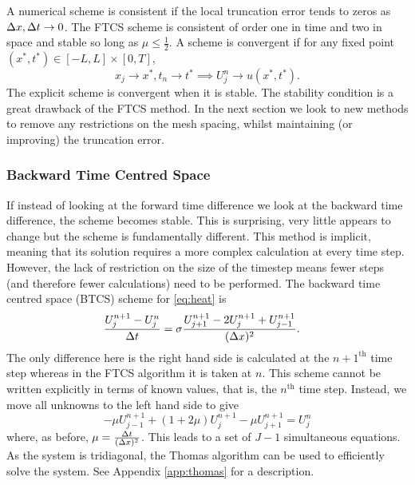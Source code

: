 A numerical scheme is consistent if the local truncation error tends to zeros as \(\Delta x, \Delta t \to 0\). The FTCS scheme is consistent of order one in time and two in space and stable so long as \(\mu \leq \frac{1}{2}\).  A scheme is convergent if for any fixed point  \((x^*,t^*) \in [-L,L] \times [0,T]\), \[x_j \to x^*, t_n \to t^* \implies U^n_j \to u(x^*,t^*).\]
The explicit scheme is convergent when it is stable. The stability condition is a great drawback of the FTCS method. In the next section we look to new methods to remove any restrictions on the mesh spacing, whilst maintaining (or improving) the truncation error.

\subsubsection*{Backward Time Centred Space}
If instead of looking at the forward time difference we look at the backward time difference, the scheme becomes stable. This is surprising, very little appears to change but the scheme is fundamentally different. This method is implicit, meaning that its solution requires a more complex calculation at every time step. However, the lack of restriction on the size of the timestep means fewer steps (and therefore fewer calculations) need to be performed. The backward time centred space (BTCS) scheme for \eqref{eq:heat} is
\begin{align}
\frac{U^{n+1}_j- U^n_j}{\Delta t} &= \sigma \frac{U^{n+1}_{j+1} - 2U^{n+1}_{j} + U^{n+1}_{j-1}}{(\Delta x)^2}.
\end{align}
The only difference here is the right hand side is calculated at the $n+1^{\text{th}}$ time step whereas in the FTCS algorithm it is taken at $n$. This scheme cannot be written explicitly in terms of known values, that is, the $n^{\text{th}}$ time step. Instead, we move all unknowns to the left hand side to give
\[
-\mu U^{n+1}_{j-1} + (1+2\mu)U^{n+1}_j - \mu U^{n+1}_{j+1} = U^n_j
\]
where, as before, $\mu=\frac{\Delta t}{(\Delta x)^2}$. This leads to a set of $J-1$ simultaneous equations. As the system is tridiagonal, the Thomas algorithm can be used to efficiently solve the system. See Appendix \ref{app:thomas} for a description.

